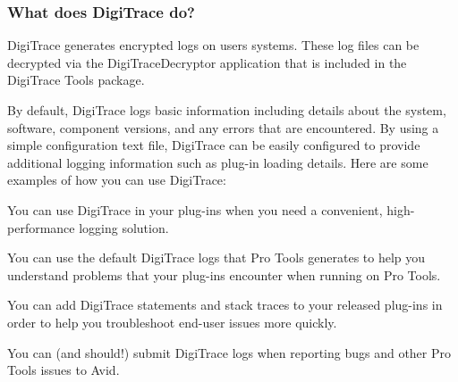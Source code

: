 \hypertarget{a00364_digitrace__intro__whatdoesitdo}{}\subsubsection{What does Digi\+Trace do?}\label{a00364_digitrace__intro__whatdoesitdo}
 Digi\+Trace generates encrypted logs on users\textquotesingle{} systems. These log files can be decrypted via the Digi\+Trace\+Decryptor application that is included in the Digi\+Trace Tools package.

 By default, Digi\+Trace logs basic information including details about the system, software, component versions, and any errors that are encountered. By using a simple configuration text file, Digi\+Trace can be easily configured to provide additional logging information such as plug-\/in loading details. Here are some examples of how you can use Digi\+Trace\+:

 
\begin{DoxyItemize}
\item You can use Digi\+Trace in your plug-\/ins when you need a convenient, high-\/performance logging solution.  
\item You can use the default Digi\+Trace logs that Pro Tools generates to help you understand problems that your plug-\/ins encounter when running on Pro Tools.  
\item You can add Digi\+Trace statements and stack traces to your released plug-\/ins in order to help you troubleshoot end-\/user issues more quickly.  
\item You can (and should!) submit Digi\+Trace logs when reporting bugs and other Pro Tools issues to Avid.  
\end{DoxyItemize}



